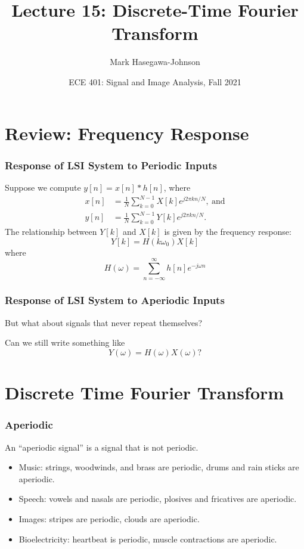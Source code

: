 \documentclass{beamer}
\title{Lecture 15: Discrete-Time Fourier Transform}
\author{Mark Hasegawa-Johnson}
\date{ECE 401: Signal and Image Analysis, Fall 2021}
\begin{document}
\begin{frame}
  \maketitle
\end{frame}

\begin{frame}
  \tableofcontents
\end{frame}

\section[Review]{Review: Frequency Response}
\setcounter{subsection}{1}

\begin{frame}
  \frametitle{Response of LSI System to Periodic Inputs}
  Suppose we compute $y[n]=x[n]\ast h[n]$, where
  \begin{align*}
  x[n] &= \frac{1}{N}\sum_{k=0}^{N-1} X[k] e^{j2\pi kn/N},~\mbox{and}\\
  y[n] &= \frac{1}{N}\sum_{k=0}^{N-1} Y[k] e^{j2\pi kn/N}.
  \end{align*}
  The relationship between $Y[k]$ and $X[k]$ is given by the frequency
  response:
  \[
  Y[k] = H(k\omega_0) X[k]
  \]
  where
  \[
  H(\omega) = \sum_{n=-\infty}^\infty h[n]e^{-j\omega n}
  \]
\end{frame}

\begin{frame}
  \frametitle{Response of LSI System to Aperiodic Inputs}

  But what about signals that never repeat themselves?

  Can we still write something like
  \[
  Y(\omega)=H(\omega)X(\omega)?
  \]

\end{frame}
  
\section[DTFT]{Discrete Time Fourier Transform}
\setcounter{subsection}{1}

\begin{frame}
  \frametitle{Aperiodic}
  
  An ``aperiodic signal'' is a signal that is not periodic.
  \begin{itemize}
  \item Music: strings, woodwinds, and brass are periodic, drums and rain sticks are aperiodic.
  \item Speech: vowels and nasals are periodic, plosives and fricatives are aperiodic.
  \item Images: stripes are periodic, clouds are aperiodic.
  \item Bioelectricity: heartbeat is periodic, muscle contractions are aperiodic.
  \end{itemize}
\end{frame}
\end{document}
